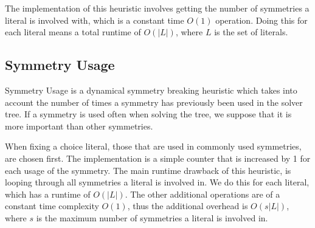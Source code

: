 	The implementation of this heuristic involves getting the number of symmetries a literal is involved with,
	which is a constant time $O(1)$ operation.
	Doing this for each literal means a total runtime of $O(|L|)$, where $L$ is the set of literals.


\subsection{Symmetry Usage}
	Symmetry Usage is a dynamical symmetry breaking heuristic
	which takes into account the number of times a symmetry has previously been used in the solver tree.
	If a symmetry is used often when solving the tree, we suppose that it is more important than other symmetries.

	When fixing a choice literal, those that are used in commonly used symmetries, are chosen first.
	The implementation is a simple counter that is increased by 1 for each usage of the symmetry.
	The main runtime drawback of this heuristic, is looping through all symmetries a literal is involved in.
	We do this for each literal, which has a runtime of $O(|L|)$.
	The other additional operations are of a constant time complexity $O(1)$, thus the additional overhead is $O(s|L|)$,
	where $s$ is the maximum number of symmetries a literal is involved in.

